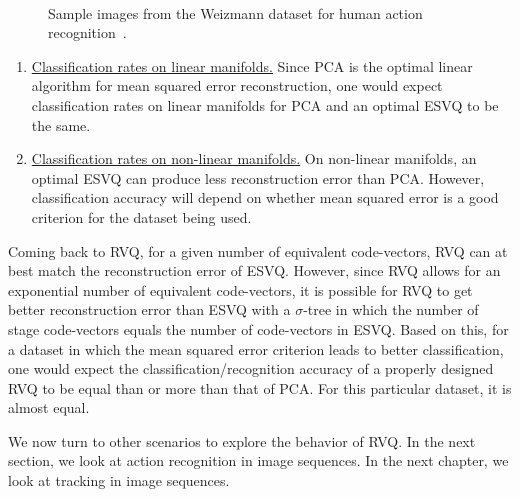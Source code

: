 \begin{Body}
									\begin{figure}[t]
									\centering	
									\\
									\caption{Sample images from the Weizmann dataset for human action recognition~\cite{2007_JNL_SpaceTimeShapes_Gorelick}.}							
									\label{fig:Weizmann_sequence}				
									\end{figure}



\begin{enumerate}
\item \underline{Classification rates on linear manifolds.}  Since PCA is the optimal linear algorithm for mean squared error reconstruction, one would expect classification rates on linear manifolds for PCA and an optimal ESVQ to be the same.  
\item \underline{Classification rates on non-linear manifolds.}  On non-linear manifolds, an optimal ESVQ can produce less reconstruction error than PCA.  However, classification accuracy will depend on whether mean squared error is a good criterion for the dataset being used.
\end{enumerate}

Coming back to RVQ, for a given number of equivalent code-vectors, RVQ can at best match the reconstruction error of ESVQ.  However, since RVQ allows for an exponential number of equivalent code-vectors, it is possible for RVQ to get better reconstruction error than ESVQ with a $\sigma$-tree in which the number of stage code-vectors equals the number of code-vectors in ESVQ.  Based on this, for a dataset in which the mean squared error criterion leads to better classification, one would expect the classification/recognition accuracy of a properly designed RVQ to be equal than or more than that of PCA.  For this particular dataset, it is almost equal.  

We now turn to other scenarios to explore the behavior of RVQ.  In the next section, we look at action recognition in image sequences.  In the next chapter, we look at tracking in image sequences.



\end{Body}
